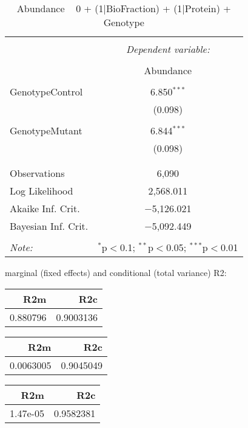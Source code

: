 \documentclass[11pt]{report}
\begin{document}
\begin{table}[!htbp] \centering 
  \caption{Abundance ~ 0 + (1|BioFraction) + (1|Protein) + Genotype} 
  \label{} 
\begin{tabular}{@{\extracolsep{5pt}}lc} 
\\[-1.8ex]\hline 
\hline \\[-1.8ex] 
 & \multicolumn{1}{c}{\textit{Dependent variable:}} \\ 
\cline{2-2} 
\\[-1.8ex] & Abundance \\ 
\hline \\[-1.8ex] 
 GenotypeControl & 6.850$^{***}$ \\ 
  & (0.098) \\ 
  & \\ 
 GenotypeMutant & 6.844$^{***}$ \\ 
  & (0.098) \\ 
  & \\ 
\hline \\[-1.8ex] 
Observations & 6,090 \\ 
Log Likelihood & 2,568.011 \\ 
Akaike Inf. Crit. & $-$5,126.021 \\ 
Bayesian Inf. Crit. & $-$5,092.449 \\ 
\hline 
\hline \\[-1.8ex] 
\textit{Note:}  & \multicolumn{1}{r}{$^{*}$p$<$0.1; $^{**}$p$<$0.05; $^{***}$p$<$0.01} \\ 
\end{tabular} 
\end{table} 
marginal (fixed effects) and conditional (total variance) R2:

\begin{tabular}{r|r}
\hline
R2m & R2c\\
\hline
0.880796 & 0.9003136\\
\hline
\end{tabular}

\begin{tabular}{r|r}
\hline
R2m & R2c\\
\hline
0.0063005 & 0.9045049\\
\hline
\end{tabular}

\begin{tabular}{r|r}
\hline
R2m & R2c\\
\hline
1.47e-05 & 0.9582381\\
\hline
\end{tabular}
\end{document}
